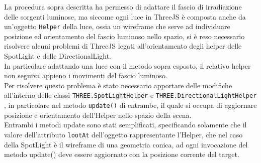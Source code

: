 La procedura sopra descritta ha permesso di adattare il fascio di irradiazione delle sorgenti luminose, ma siccome ogni luce in ThreeJS è composta anche da un’oggetto \texttt{Helper} della luce, ossia un wireframe che serve ad individuare posizione ed orientamento del fascio luminoso nello spazio, si è reso necessario risolvere alcuni problemi di ThreeJS legati all’orientamento degli helper delle SpotLight e delle DirectionalLight.
\\ 
In particolare adattando una luce con il metodo sopra esposto, il relativo helper non seguiva appieno i movimenti del fascio luminoso.
\\
Per risolvere questo problema è stato necessario apportare delle modifiche all’interno delle classi \texttt{THREE.SpotLightHelper} e \texttt{THREE.DirectionalLightHelper} , in particolare nel metodo \texttt{update()} di entrambe, il quale si occupa di aggiornare posizione e orientamento dell’Helper nello spazio della scena.
\\
Entrambi i metodi update sono stati semplificati, specificando solamente che il valore dell’attributo \texttt{lootAt} dell’oggetto rappresentante l’Helper, che nel caso della SpotLight è il wireframe di una geometria conica, ad ogni invocazione del metodo update() deve essere aggiornato con la posizione corrente del target. 